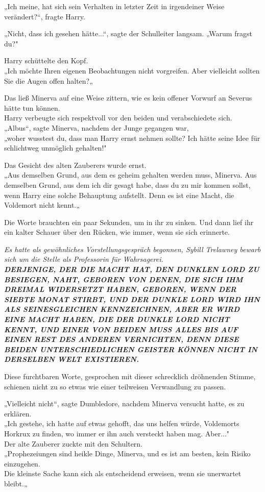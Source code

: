 {„Ich meine, hat sich sein Verhalten in letzter Zeit in irgendeiner Weise verändert?“, fragte Harry.

„Nicht, dass ich gesehen hätte...“, sagte der Schulleiter langsam. „Warum fragst du?"

Harry schüttelte den Kopf.\\ „Ich möchte Ihren eigenen Beobachtungen nicht vorgreifen. Aber vielleicht sollten Sie die Augen offen halten?„

Das ließ Minerva auf eine Weise zittern, wie es kein offener Vorwurf an Severus hätte tun können.\\ Harry verbeugte sich respektvoll vor den beiden und verabschiedete sich.\\ „Albus“, sagte Minerva, nachdem der Junge gegangen war,\\ „woher wusstest du, dass man Harry ernst nehmen sollte? Ich hätte seine Idee für schlichtweg unmöglich gehalten!"

Das Gesicht des alten Zauberers wurde ernst.\\ „Aus demselben Grund, aus dem es geheim gehalten werden muss, Minerva. Aus demselben Grund, aus dem ich dir gesagt habe, dass du zu mir kommen sollst, wenn Harry eine solche Behauptung aufstellt. Denn es ist eine Macht, die Voldemort nicht kennt.„

Die Worte brauchten ein paar Sekunden, um in ihr zu sinken. Und dann lief ihr ein kalter Schauer über den Rücken, wie immer, wenn sie sich erinnerte.

\emph{Es hatte als gewöhnliches Vorstellungsgespräch begonnen, Sybill Trelawney bewarb sich um die Stelle als Professorin für Wahrsagerei.}\\ \emph{\hfill\break }\textbf{\emph{DERJENIGE, DER DIE MACHT HAT, DEN DUNKLEN LORD ZU BESIEGEN, NAHT, GEBOREN VON DENEN, DIE SICH IHM DREIMAL WIDERSETZT HABEN, GEBOREN, WENN DER SIEBTE MONAT STIRBT, UND DER DUNKLE LORD WIRD IHN ALS SEINESGLEICHEN KENNZEICHNEN, ABER ER WIRD EINE MACHT HABEN, DIE DER DUNKLE LORD NICHT KENNT, UND EINER VON BEIDEN MUSS ALLES BIS AUF EINEN REST DES ANDEREN VERNICHTEN, DENN DIESE BEIDEN UNTERSCHIEDLICHEN GEISTER KÖNNEN NICHT IN DERSELBEN WELT EXISTIEREN.}}

Diese furchtbaren Worte, gesprochen mit dieser schrecklich dröhnenden Stimme, schienen nicht zu so etwas wie einer teilweisen Verwandlung zu passen.

„Vielleicht nicht“, sagte Dumbledore, nachdem Minerva versucht hatte, es zu erklären.\\ „Ich gestehe, ich hatte auf etwas gehofft, das uns helfen würde, Voldemorts Horkrux zu finden, wo immer er ihn auch versteckt haben mag. Aber..."\\ Der alte Zauberer zuckte mit den Schultern.\\ „Prophezeiungen sind heikle Dinge, Minerva, und es ist am besten, kein Risiko einzugehen.\\ Die kleinste Sache kann sich als entscheidend erweisen, wenn sie unerwartet bleibt.„

}
